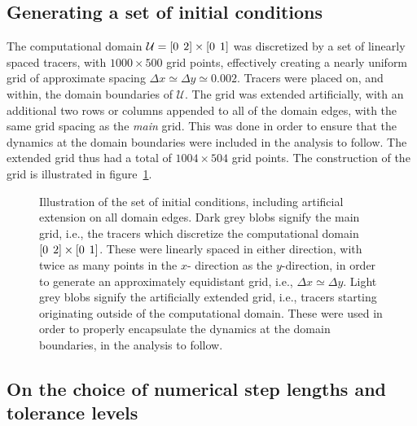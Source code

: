 \subsection{Generating a set of initial conditions}
\label{sub:generating_a_set_of_initial_conditions}
The computational domain $\mathcal{U}=[0\hspace{1ex}2]\times[0\hspace{1ex}1]$
was discretized by a set of linearly spaced tracers, with $1000\times500$ grid
points, effectively creating a nearly uniform grid of approximate spacing
$\Delta{x}\simeq\Delta{y}\simeq0.002$. Tracers were placed on, and within, the
domain boundaries of $\mathcal{U}$. The grid was extended artificially,
with an additional two rows or columns appended to all of the domain edges,
with the same grid spacing as the \emph{main} grid. This was done in order to
ensure that the dynamics at the domain boundaries were included in the analysis
to follow. The extended grid thus had a total of $1004\times504$ grid points.
The construction of the grid is illustrated in figure~\ref{fig:initialgrid}.

\begin{figure}[htpb]
    \centering
    \resizebox{0.8\linewidth}{!}{}
    \caption[Illustration of the set of initial conditions, including
                artificial extension]{Illustration of the set of initial
                conditions, including artificial extension on all domain edges.
                Dark grey blobs signify the main grid, i.e., the tracers
                which discretize the computational domain
            $[0\hspace{1ex}2]\times[0\hspace{1ex}1]$. These were linearly
        spaced in either direction, with twice as many points in the $x$-
        direction as the $y$-direction, in order to generate an approximately
        equidistant grid, i.e., $\Delta{x}\simeq\Delta{y}$. Light grey blobs
        signify the artificially extended grid, i.e., tracers starting
        originating outside of the computational domain. These were used in
        order to properly encapsulate the dynamics at the domain boundaries,
        in the analysis to follow.}
    \label{fig:initialgrid}
\end{figure}

\subsection{On the choice of numerical step lengths and tolerance levels}
\label{sub:on_the_choice_of_numerical_step_lengths_and_tolerance_levels}

